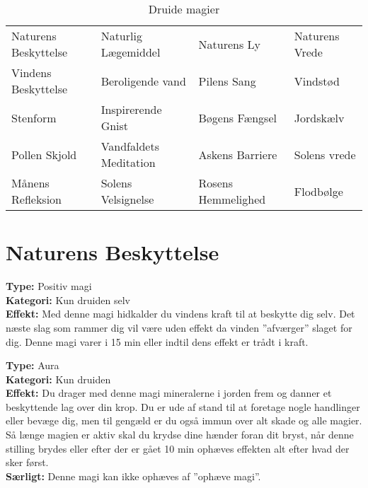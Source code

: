 \begin{table}[H]
    \centering
    \begin{tabular}{|p{}|p{}|p{}|p{}|}
    \hline
    \rowcolor{cerulean!80}
    \multicolumn{4}{c}{Druide magi}\\
    \hline
    \rowcolor{cerulean!40}
         Naturens Beskyttelse   & Naturlig Lægemiddel    & Naturens Ly           & Naturens Vrede   \\\hline
         Vindens Beskyttelse    & Beroligende vand       & Pilens Sang           & Vindstød         \\\hline
         Stenform               & Inspirerende Gnist     & Bøgens Fængsel        & Jordskælv        \\\hline
         Pollen Skjold          & Vandfaldets Meditation & Askens Barriere       & Solens vrede     \\\hline
         Månens Refleksion      & Solens Velsignelse     & Rosens Hemmelighed    & Flodbølge        \\\hline
         \end{tabular}
         \caption{Druide magier}
\end{table}

\newpage
\section{Naturens Beskyttelse}

\begin{nBeskyt*}
\textbf{Type:} Positiv magi\\ 
\textbf{Kategori:} Kun druiden selv\\
\textbf{Effekt:} Med denne magi hidkalder du vindens kraft til at beskytte dig selv. Det næste slag som rammer dig vil være uden effekt da vinden ”afværger” slaget for dig. Denne magi varer i 15 min eller indtil dens effekt er trådt i kraft.
\end{nBeskyt*}

\begin{nBeskyt*}[Stenform]
\textbf{Type:} Aura \\
\textbf{Kategori:} Kun druiden \\
\textbf{Effekt:} Du drager med denne magi mineralerne i jorden frem og danner et beskyttende lag over din krop. Du er ude af stand til at foretage nogle handlinger eller bevæge dig, men til gengæld er du også immun over alt skade og alle magier.\\
Så længe magien er aktiv skal du krydse dine hænder foran dit bryst, når denne stilling brydes eller efter der er gået 10 min ophæves effekten alt efter hvad der sker først.\\
\textbf{Særligt:} Denne magi kan ikke ophæves af ”ophæve magi”.
\end{nBeskyt*}

